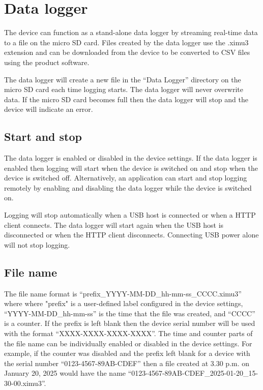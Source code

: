 \section{Data logger}

The device can function as a stand-alone data logger by streaming real-time data to a file on the micro \ac{SD} card.  Files created by the data logger use the .ximu3 extension and can be downloaded from the device to be converted to \ac{CSV} files using the product software.

The data logger will create a new file in the \enquote{Data Logger} directory on the micro \ac{SD} card each time logging starts.  The data logger will never overwrite data.  If the micro \ac{SD} card becomes full then the data logger will stop and the device will indicate an error.

\subsection{Start and stop}

The data logger is enabled or disabled in the device settings.  If the data logger is enabled then logging will start when the device is switched on and stop when the device is switched off.  Alternatively, an application can start and stop logging remotely by enabling and disabling the data logger while the device is switched on.

Logging will stop automatically when a \ac{USB} host is connected or when a \ac{HTTP} client connects.  The data logger will start again when the \ac{USB} host is disconnected or when the \ac{HTTP} client disconnects.  Connecting \ac{USB} power alone will not stop logging.

\subsection{File name}

The file name format is \enquote{prefix\_YYYY-MM-DD\_hh-mm-ss\_CCCC.ximu3} where where "prefix" is a user-defined label configured in the device settings, \enquote{YYYY-MM-DD\_hh-mm-ss} is the time that the file was created, and \enquote{CCCC} is a counter.  If the prefix is left blank then the device serial number will be used with the format \enquote{XXXX-XXXX-XXXX-XXXX}.  The time and counter parts of the file name can be individually enabled or disabled in the device settings.  For example, if the counter was disabled and the prefix left blank for a device with the serial number \enquote{0123-4567-89AB-CDEF} then a file created at 3.30 p.m. on January 20, 2025 would have the name \enquote{0123-4567-89AB-CDEF\_2025-01-20\_15-30-00.ximu3}.

